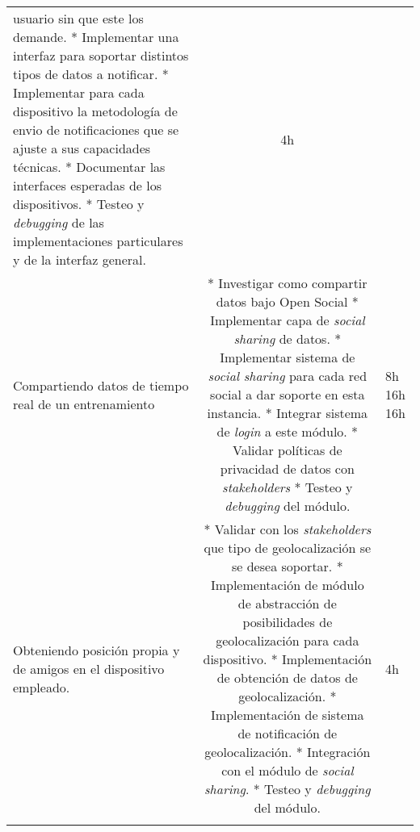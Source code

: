\begin{longtable}[c]{@{}lcl@{}}
\begin{minipage}[t]{0.62\columnwidth}
usuario sin que este los demande. * Implementar una interfaz para
soportar distintos tipos de datos a notificar. * Implementar para cada
dispositivo la metodología de envio de notificaciones que se ajuste a
sus capacidades técnicas. * Documentar las interfaces esperadas de los
dispositivos. * Testeo y \emph{debugging} de las implementaciones
particulares y de la interfaz general.
\end{minipage} & \begin{minipage}[t]{0.10\columnwidth}\raggedright
4h
\end{minipage}
\\\noalign{\medskip}
\begin{minipage}[t]{0.28\columnwidth}\raggedright
Compartiendo datos de tiempo real de un entrenamiento
\end{minipage} & \begin{minipage}[t]{0.62\columnwidth}\centering
* Investigar como compartir datos bajo Open Social * Implementar capa de
\emph{social sharing} de datos. * Implementar sistema de \emph{social
sharing} para cada red social a dar soporte en esta instancia. *
Integrar sistema de \emph{login} a este módulo. * Validar políticas de
privacidad de datos con \emph{stakeholders} * Testeo y \emph{debugging}
del módulo.
\end{minipage} & \begin{minipage}[t]{0.10\columnwidth}\raggedright
8h 16h 16h
\end{minipage}
\\\noalign{\medskip}
\begin{minipage}[t]{0.28\columnwidth}\raggedright
Obteniendo posición propia y de amigos en el dispositivo empleado.
\end{minipage} & \begin{minipage}[t]{0.62\columnwidth}\centering
* Validar con los \emph{stakeholders} que tipo de geolocalización se se
desea soportar. * Implementación de módulo de abstracción de
posibilidades de geolocalización para cada dispositivo. * Implementación
de obtención de datos de geolocalización. * Implementación de sistema de
notificación de geolocalización. * Integración con el módulo de
\emph{social sharing}. * Testeo y \emph{debugging} del módulo.
\end{minipage} & \begin{minipage}[t]{0.10\columnwidth}\raggedright
4h
\end{minipage}
\\\noalign{\medskip}
\begin{minipage}[t]{0.28\columnwidth}\raggedright

\end{minipage}
\end{longtable}
